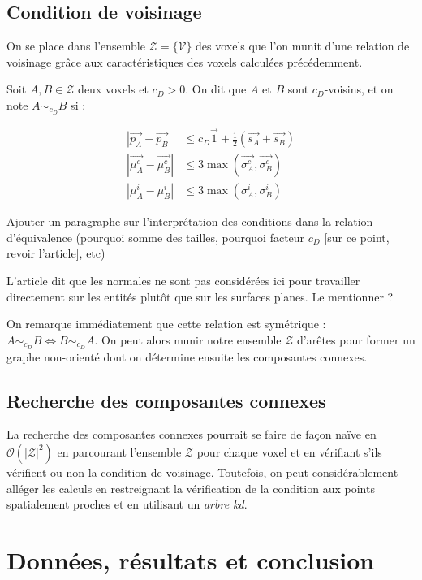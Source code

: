 \documentclass[a4paper, onecolumn, 11pt]{article}
\newcommand{\TODO}{\fbox{\textcolor{red}{TODO}}}
\begin{document}
\subsection{Condition de voisinage}
On se place dans l'ensemble $\mathcal{Z} = \{\mathcal{V}\}$ des voxels que l'on munit d'une relation de voisinage grâce aux caractéristiques des voxels calculées précédemment.

Soit $A, B \in \mathcal{Z}$ deux voxels et $c_D > 0$. On dit que $A$ et $B$ sont $c_D$-voisins, et on note $A \sim_{c_D} B$ si :

\begin{align}
\left|\overrightarrow{p_A} - \overrightarrow{p_B}\right| &\leq c_D\overrightarrow{1} + \frac{1}{2} \left(\overrightarrow{s_A} + \overrightarrow{s_B}\right)\\
\left|\overrightarrow{\mu_A^c} - \overrightarrow{\mu_B^c}\right| &\leq 3 \max\left(\overrightarrow{\sigma_A^c}, \overrightarrow{\sigma_B^c}\right)\\
\left|\mu_A^i - \mu_B^i\right| &\leq 3 \max\left(\sigma_A^i, \sigma_B^i\right)
\end{align}


\TODO Ajouter un paragraphe sur l'interprétation des conditions dans la relation d'équivalence (pourquoi somme des tailles, pourquoi facteur $c_D$ [sur ce point, revoir l'article], etc)

\TODO L'article dit que les normales ne sont pas considérées ici pour travailler directement sur les entités plutôt que sur les surfaces planes. Le mentionner ?

On remarque immédiatement que cette relation est symétrique : $A \sim_{c_D} B \Leftrightarrow B \sim_{c_D} A$. On peut alors munir notre ensemble $\mathcal{Z}$ d'arêtes pour former un graphe non-orienté dont on détermine ensuite les composantes connexes.

\subsection{Recherche des composantes connexes}
La recherche des composantes connexes pourrait se faire de façon naïve en $\mathcal{O}(|\mathcal{Z}|^2)$ en parcourant l'ensemble $\mathcal{Z}$ pour chaque voxel et en vérifiant s'ils vérifient ou non la condition de voisinage. Toutefois, on peut considérablement alléger les calculs en restreignant la vérification de la condition aux points spatialement proches et en utilisant un \emph{arbre kd}.

\section{Données, résultats et conclusion}
\end{document}

